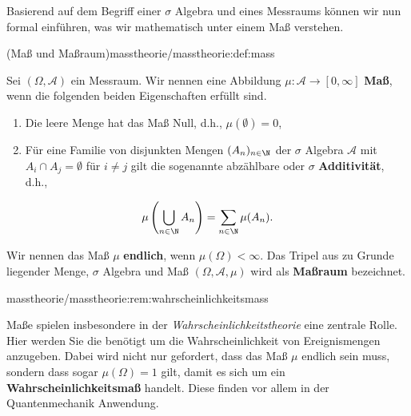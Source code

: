 \documentclass[letterpaper,10pt,english]{jupyterBook}
\begin{document}
\par
Basierend auf dem Begriff einer \(\sigma\) Algebra und eines Messraums können wir nun formal einführen, was wir mathematisch unter einem Maß verstehen.
\begin{definition}{(Maß und Maßraum)}{masstheorie/masstheorie:def:mass}



\par
Sei \((\Omega, \mathcal{A})\) ein Messraum.
Wir nennen eine Abbildung \(\mu: \mathcal{A}\to [0, \infty]\) \textbf{Maß}, wenn die folgenden beiden Eigenschaften erfüllt sind.
\begin{enumerate}

\item {} 
\par
Die leere Menge hat das Maß Null, d.h., \(\mu(\emptyset) = 0\),

\item {} 
\par
Für eine Familie von disjunkten Mengen \((A_n)_{n\in\N}\) der \(\sigma\) Algebra \(\mathcal{A}\) mit \(A_i \cap A_j = \emptyset\) für \(i \neq j\) gilt die sogenannte abzählbare oder \(\sigma\) \textbf{Additivität}, d.h.,

\end{enumerate}
\begin{align*}
\mu\left( \bigcup_{n\in\N}A_n \right) = \sum_{n\in\N}\mu (A_n).
\end{align*}
\par
Wir nennen das Maß \(\mu\) \textbf{endlich}, wenn \(\mu(\Omega)<\infty\).
Das Tripel aus zu Grunde liegender Menge, \(\sigma\) Algebra und Maß \((\Omega, \mathcal{A}, \mu)\) wird als \textbf{Maßraum} bezeichnet.
\end{definition}
\begin{remark}{}{masstheorie/masstheorie:rem:wahrscheinlichkeitsmass}



\par
Maße spielen insbesondere in der \emph{Wahrscheinlichkeitstheorie} eine zentrale Rolle.
Hier werden Sie die benötigt um die Wahrscheinlichkeit von Ereignismengen anzugeben.
Dabei wird nicht nur gefordert, dass das Maß \(\mu\) endlich sein muss, sondern dass sogar \(\mu(\Omega)=1\) gilt, damit es sich um ein \textbf{Wahrscheinlichkeitsmaß} handelt.
Diese finden vor allem in der Quantenmechanik Anwendung.
\end{remark}
\end{document}
